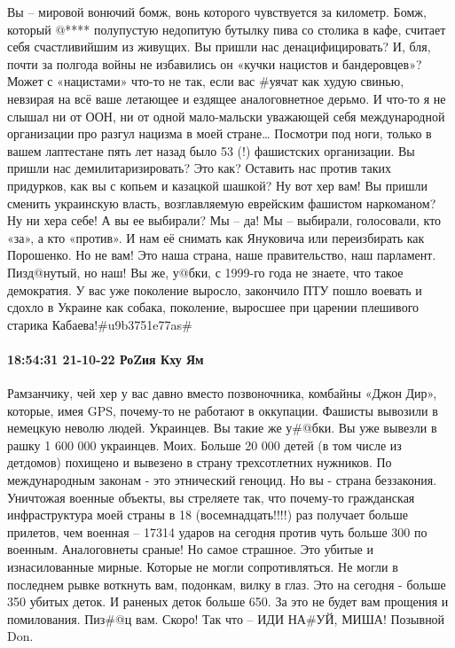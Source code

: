 Вы – мировой вонючий бомж, вонь которого чувствуется за километр. Бомж, который @**** полупустую недопитую бутылку пива со столика в кафе, считает себя счастливийшим из живущих.
Вы пришли нас денацифицировать? И, бля, почти за полгода войны не избавились он «кучки нацистов и бандеровцев»? Может с «нацистами» что-то не так, если вас #уячат как худую свинью, невзирая на всё ваше летающее и ездящее аналоговнетное дерьмо. И что-то я не слышал ни от ООН, ни от одной мало-мальски уважающей себя международной организации про разгул нацизма в моей стране… Посмотри под ноги, только в вашем лаптестане пять лет назад было 53 (!) фашистских организации.
Вы пришли нас демилитаризировать? Это как? Оставить нас против таких придурков, как вы с копьем и казацкой шашкой? Ну вот хер вам!
Вы пришли сменить украинскую власть, возглавляемую еврейским фашистом наркоманом? Ну ни хера себе! А вы ее выбирали? Мы – да! Мы – выбирали, голосовали, кто «за», а кто «против». И нам её снимать как Януковича или переизбирать как Порошенко. Но не вам! Это наша страна, наше правительство, наш парламент. Пизд@нутый, но наш! Вы же, у@бки, с 1999-го года не знаете, что такое демократия. У вас уже поколение выросло, закончило ПТУ пошло воевать и сдохло в Украине как собака, поколение, выросшее при царении плешивого старика Кабаева!#u9b3751e77as#

\paragraph{18:54:31 21-10-22 РоZия Кху Ям}

Рамзанчику, чей хер у вас давно вместо позвоночника, комбайны «Джон Дир», которые, имея GPS, почему-то не работают в оккупации.
Фашисты вывозили в немецкую неволю людей. Украинцев.
Вы такие же у#@бки.
Вы уже вывезли в рашку 1 600 000 украинцев. Моих. Больше 20 000 детей (в том числе из детдомов) похищено и вывезено в страну трехсотлетних нужников. По международным законам - это этнический геноцид. Но вы - страна беззакония.
Уничтожая военные объекты, вы стреляете так, что почему-то гражданская инфраструктура моей страны в 18 (восемнадцать!!!!) раз получает больше прилетов, чем военная – 17314 ударов на сегодня против чуть больше 300 по военным.
Аналоговнеты сраные!
Но самое страшное. Это убитые и изнасилованные мирные. Которые не могли сопротивляться. Не могли в последнем рывке воткнуть вам, подонкам, вилку в глаз.
Это на сегодня - больше 350 убитых деток. И раненых деток больше 650.
За это не будет вам прощения и помилования. Пиз#@ц вам. Скоро!
Так что – ИДИ НА#УЙ, МИША!
Позывной Don.


